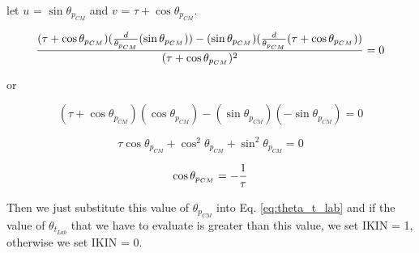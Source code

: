 let $u$ = $\sin \theta_{p_{CM}}$ and $v$ = $\tau + \cos \theta_{p_{CM}}$.

\begin{equation}
{(\tau + \cos \theta_{p_{CM}})
({d \over \theta_{p_{CM}}}(\sin \theta_{p_{CM}})) -
(\sin \theta_{p_{CM}})
({d \over \theta_{p_{CM}}}(\tau + \cos \theta_{p_{CM}})) 
\over
(\tau + \cos \theta_{p_{CM}})^2} = 0
\label{eq:dtheta_p_lab3}
\end{equation}

or

\begin{equation}
(\tau + \cos \theta_{p_{CM}}) (\cos \theta_{p_{CM}}) -
(\sin \theta_{p_{CM}}) ( - \sin \theta_{p_{CM}})
 = 0
\label{eq:dtheta_p_lab4}
\end{equation}

\begin{equation}
\tau \cos \theta_{p_{CM}} + \cos^2 \theta_{p_{CM}} +
\sin^2 \theta_{p_{CM}} = 0
\label{eq:dtheta_p_lab5}
\end{equation}

\begin{equation}
\cos \theta_{p_{CM}} = -{1 \over \tau}
\label{eq:dtheta_p_lab6}
\end{equation}

Then we just substitute this value of $\theta_{p_{CM}}$ into Eq.
\ref{eq:theta_t_lab} and if the value of $\theta_{t_{Lab}}$ that we have to
evaluate is greater than this value, we set IKIN = 1, otherwise we set IKIN
= 0.

